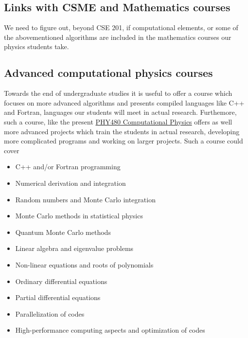 \documentclass[%
oneside,                 %
final,                   %
10pt]{article}
\begin{document}
\subsection{Links with CSME and Mathematics courses}

We need to figure out, beyond CSE 201, if computational elements, or some of the abovementioned algorithms are included in the mathematics courses our physics students take.


\subsection{Advanced computational physics courses}

Towards the end of undergraduate studies it is useful to offer a course which focuses on more advanced algorithms and presents compiled languages like C++ and Fortran, languages our students will meet in actual research.
Furthemore, such a course, like the present \href{{https://github.com/CompPhysics/ComputationalPhysicsMSU}}{PHY480 Computational Physics} offers as well more advanced projects which train the students in actual research, developing more complicated programs and working on larger projects.
Such a course could cover
\begin{itemize}
  \item C++ and/or Fortran programming

  \item Numerical derivation and integration

  \item Random numbers and Monte Carlo integration

  \item Monte Carlo methods in statistical physics

  \item Quantum Monte Carlo methods

  \item Linear algebra and eigenvalue problems

  \item Non-linear equations and roots of polynomials

  \item Ordinary differential equations

  \item Partial differential equations

  \item Parallelization of codes

  \item High-performance computing aspects and optimization of codes
\end{itemize}
\end{document}
